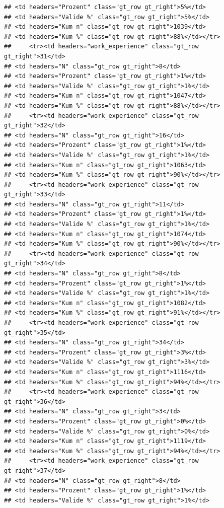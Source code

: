 \documentclass[
  a4paper,
  DIV=11,
  numbers=noendperiod]{scrartcl}
\begin{document}
\begin{verbatim}
## <td headers="Prozent" class="gt_row gt_right">5%</td>
## <td headers="Valide %" class="gt_row gt_right">5%</td>
## <td headers="Kum n" class="gt_row gt_right">1039</td>
## <td headers="Kum %" class="gt_row gt_right">88%</td></tr>
##     <tr><td headers="work_experience" class="gt_row gt_right">31</td>
## <td headers="N" class="gt_row gt_right">8</td>
## <td headers="Prozent" class="gt_row gt_right">1%</td>
## <td headers="Valide %" class="gt_row gt_right">1%</td>
## <td headers="Kum n" class="gt_row gt_right">1047</td>
## <td headers="Kum %" class="gt_row gt_right">88%</td></tr>
##     <tr><td headers="work_experience" class="gt_row gt_right">32</td>
## <td headers="N" class="gt_row gt_right">16</td>
## <td headers="Prozent" class="gt_row gt_right">1%</td>
## <td headers="Valide %" class="gt_row gt_right">1%</td>
## <td headers="Kum n" class="gt_row gt_right">1063</td>
## <td headers="Kum %" class="gt_row gt_right">90%</td></tr>
##     <tr><td headers="work_experience" class="gt_row gt_right">33</td>
## <td headers="N" class="gt_row gt_right">11</td>
## <td headers="Prozent" class="gt_row gt_right">1%</td>
## <td headers="Valide %" class="gt_row gt_right">1%</td>
## <td headers="Kum n" class="gt_row gt_right">1074</td>
## <td headers="Kum %" class="gt_row gt_right">90%</td></tr>
##     <tr><td headers="work_experience" class="gt_row gt_right">34</td>
## <td headers="N" class="gt_row gt_right">8</td>
## <td headers="Prozent" class="gt_row gt_right">1%</td>
## <td headers="Valide %" class="gt_row gt_right">1%</td>
## <td headers="Kum n" class="gt_row gt_right">1082</td>
## <td headers="Kum %" class="gt_row gt_right">91%</td></tr>
##     <tr><td headers="work_experience" class="gt_row gt_right">35</td>
## <td headers="N" class="gt_row gt_right">34</td>
## <td headers="Prozent" class="gt_row gt_right">3%</td>
## <td headers="Valide %" class="gt_row gt_right">3%</td>
## <td headers="Kum n" class="gt_row gt_right">1116</td>
## <td headers="Kum %" class="gt_row gt_right">94%</td></tr>
##     <tr><td headers="work_experience" class="gt_row gt_right">36</td>
## <td headers="N" class="gt_row gt_right">3</td>
## <td headers="Prozent" class="gt_row gt_right">0%</td>
## <td headers="Valide %" class="gt_row gt_right">0%</td>
## <td headers="Kum n" class="gt_row gt_right">1119</td>
## <td headers="Kum %" class="gt_row gt_right">94%</td></tr>
##     <tr><td headers="work_experience" class="gt_row gt_right">37</td>
## <td headers="N" class="gt_row gt_right">8</td>
## <td headers="Prozent" class="gt_row gt_right">1%</td>
## <td headers="Valide %" class="gt_row gt_right">1%</td>

\end{verbatim}
\end{document}
